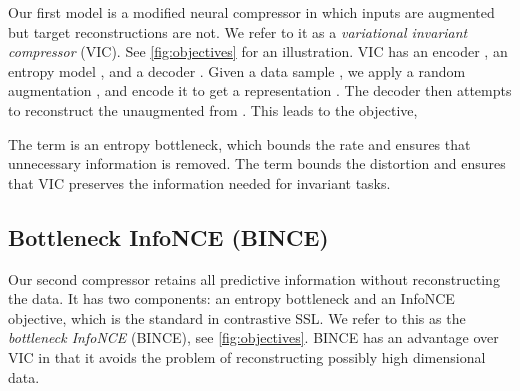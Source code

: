 \documentclass[final]{article}
\begin{document}
Our first model is a modified neural compressor in which inputs are augmented but target reconstructions are not.
We refer to it as a \textit{variational invariant compressor} (VIC).
See \cref{fig:objectives} for an illustration.
VIC has an encoder , an entropy model , and a decoder .
Given a data sample , we apply a random augmentation , and encode it to get a representation .
The decoder then attempts to reconstruct the unaugmented  from . This leads to the objective,

The term  is an entropy bottleneck, which bounds the rate  and ensures that unnecessary information is removed.
The term  bounds the distortion  and ensures that VIC preserves the information needed for invariant tasks.




\subsection{Bottleneck InfoNCE (BINCE)}
\label{sec:BINCE}



Our second compressor retains all predictive information without reconstructing the data. It has two components: an entropy bottleneck and an InfoNCE \cite{oord_representation_2019} objective, which is the standard in contrastive SSL. We refer to this as the \textit{bottleneck InfoNCE} (BINCE), see \cref{fig:objectives}. BINCE has an advantage over VIC in that it avoids the problem of reconstructing possibly  high dimensional data.
\end{document}
